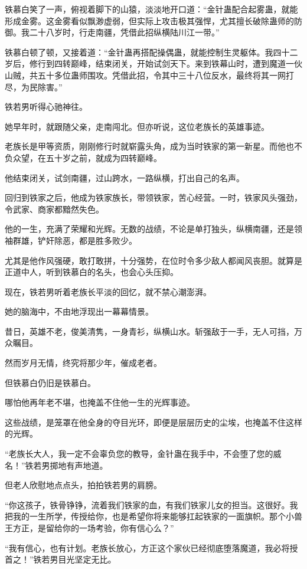 \begin{this_body}
铁慕白笑了一声，俯视着脚下的山猿，淡淡地开口道：“金针蛊配合起雾蛊，就能形成金雾。这金雾看似飘渺虚弱，但实际上攻击极其强悍，尤其擅长破除蛊师的防御。我二十八岁时，行走南疆，凭借此招纵横陆川江一带。”

铁慕白顿了顿，又接着道：“金针蛊再搭配操偶蛊，就能控制生灵躯体。我四十二岁后，修行到四转巅峰，结束闭关，开始试剑天下。来到铁幕山时，遭到魔道一伙山贼，共五十多位蛊师围攻。凭借此招，令其中三十八位反水，最终将其一网打尽，为民除害。”

铁若男听得心驰神往。

她早年时，就跟随父亲，走南闯北。但亦听说，这位老族长的英雄事迹。

老族长是甲等资质，刚刚修行时就崭露头角，成为当时铁家的第一新星。而他也不负众望，在五十岁之前，就成为四转巅峰。

他结束闭关，试剑南疆，过山跨水，一路纵横，打出自己的名声。

回归到铁家之后，他成为铁家族长，带领铁家，苦心经营。一时，铁家风头强劲，令武家、商家都黯然失色。

他的一生，充满了荣耀和光辉。无数的战绩，不论是单打独头，纵横南疆，还是领袖群雄，铲奸除恶，都是胜多败少。

尤其是他作风强硬，敢打敢拼，十分强势，在位时令多少敌人都闻风丧胆。就算是正道中人，听到铁慕白的名头，也会心头压抑。

现在，铁若男听着老族长平淡的回忆，就不禁心潮澎湃。

她的脑海中，不由地浮现出一幕幕情景。

昔日，英雄不老，俊美清隽，一身青衫，纵横山水。斩强敌于一手，无人可挡，万众瞩目。

然而岁月无情，终究将那少年，催成老者。

但铁慕白仍旧是铁慕白。

哪怕他再年老不堪，也掩盖不住他一生的光辉事迹。

这些战绩，是笼罩在他全身的夺目光环，即便是层层历史的尘埃，也掩盖不住这样的光辉。

“老族长大人，我一定不会辜负您的教导，金针蛊在我手中，不会堕了您的威名！”铁若男掷地有声地道。

但老人欣慰地点点头，拍拍铁若男的肩膀。

“你这孩子，铁骨铮铮，流着我们铁家的血，有我们铁家儿女的担当。这很好。我把我的一生所学，传授给你，也是希望你将来能够扛起铁家的一面旗帜。那个小兽王方正，是留给你的一场考验，你有信心么？”

“我有信心，也有计划。老族长放心，方正这个家伙已经彻底堕落魔道，我必将授首之！”铁若男目光坚定无比。


\end{this_body}
